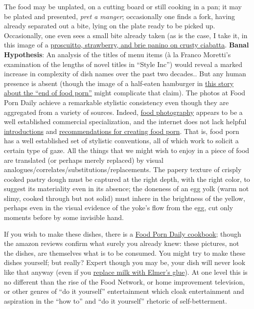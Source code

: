 \documentclass[
  12pt,
]{article}
\begin{document}
The food may be unplated, on a cutting board or still cooking in a pan;
it may be plated and presented, \emph{pret a manger}; occasionally one
finds a fork, having already separated out a bite, lying on the plate
ready to be picked up. Occasionally, one even sees a small bite already
taken (as is the case, I take it, in this image of a
\href{http://foodporndaily.com/pictures/prosciutto-strawberry-and-brie-panino-on-crusty-ciabatta/}{proscuitto,
strawberry, and brie panino on crusty ciabatta}. {\textbf{Banal
Hypothesis}: An analysis of the titles of menu items (à la Franco
Moretti's examination of the lengths of novel titles in ``Style Inc'')
would reveal a marked increase in complexity of dish names over the past
two decades.}. But any human presence is absent (though the image of a
half-eaten hamburger in
\href{http://www.huffingtonpost.com/2013/01/24/restaurant-photo-ban-death-of-food-porn_n_2543306.html}{this
story about the ``end of food porn''} might complicate that claim). The
photos at Food Porn Daily achieve a remarkable stylistic consistency
even though they are aggregated from a variety of sources. Indeed,
\href{http://en.wikipedia.org/wiki/Food_photography}{food photography}
appears to be a well established commercial specialization, and the
internet does not lack helpful
\href{http://digital-photography-school.com/food-photography-an-introduction}{introductions}
and
\href{http://articles.latimes.com/2013/apr/10/news/la-dd-food-photography-101-creating-food-porn-with-texture-20130409}{recommendations
for creating food porn}. That is, food porn has a well established set
of stylistic conventions, all of which work to solicit a certain type of
gaze. All the things that we might wish to enjoy in a piece of food are
translated (or perhaps merely replaced) by visual
analogues/correlates/substitutions/replacements. The papery texture of
crisply cooked pastry dough must be captured at the right depth, with
the right color, to suggest its materiality even in its absence; the
doneness of an egg yolk (warm not slimy, cooked through but not solid)
must inhere in the brightness of the yellow, perhaps even in the visual
evidence of the yoke's flow from the egg, cut only moments before by
some invisible hand.

If you wish to make these dishes, there is a
\href{http://www.amazon.com/Food-Porn-Daily-Amanda-Simpson/dp/1599553996/}{Food
Porn Daily cookbook}; though the amazon reviews confirm what surely you
already knew: these pictures, not the dishes, are themselves what is to
be consumed. You might try to make these dishes yourself; but really?
Expert though you may be, your dish will never look like that anyway
(even if you
\href{http://underthetuscangun.com/talk/foodography/an-inside-look-at-digital-food-photograhy/attachment/final-cereal-spoon-drip-1-of-1-2/}{replace
milk with Elmer's glue}). At one level this is no different than the
rise of the Food Network, or home improvement television, or other
genres of ``do it yourself'' entertainment which cloak entertainment and
aspiration in the ``how to'' and ``do it yourself'' rhetoric of
self-betterment.
\end{document}
